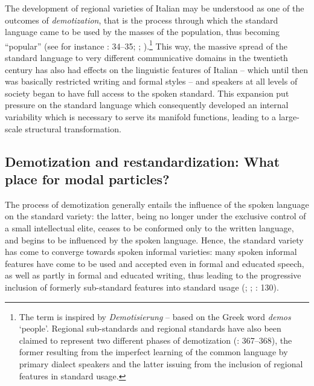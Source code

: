 The development of regional varieties of Italian may be understood as one of the outcomes of \textit{demotization}, that is the process through which the standard language came to be used by the masses of the population, thus becoming “popular” (see for instance \citealt{Berruto2017}: 34–35; \citealt{CouplandKristiansen2011}; \citealt{AuerSpiekermann2011}).\footnote{The term is inspired by  \textit{Demotisierung} – based on the Greek word \textit{demos} ‘people’. Regional sub-standards and regional standards have also been claimed to represent two different phases of demotization (\citealt{Auer2017}: 367–368), the former resulting from the imperfect learning of the common language by primary dialect speakers and the latter issuing from the inclusion of regional features in standard usage.} This way, the massive spread of the standard language to very different communicative domains in the twentieth century has also had effects on the linguistic features of Italian – which until then was basically restricted writing and formal styles – and speakers at all levels of society began to have full access to the spoken standard. This expansion put pressure on the standard language which consequently developed an internal variability which is necessary to serve its manifold functions, leading to a large-scale structural transformation.

\subsection{Demotization and restandardization: What place for modal particles?}
\hypertarget{Toc124860643}{}
The process of demotization generally entails the influence of the spoken language on the standard variety: the latter, being no longer under the exclusive control of a small intellectual elite, ceases to be conformed only to the written language, and begins to be influenced by the spoken language. Hence, the standard variety has come to converge towards spoken informal varieties: many spoken informal features have come to be used and accepted even in formal and educated speech, as well as partly in formal and educated writing, thus leading to the progressive inclusion of formerly sub-standard features into standard usage (\citealt{Berruto2012}; \citealt{CerrutiEtAl2017}; \citealt{Cerruti2020}: 130).

